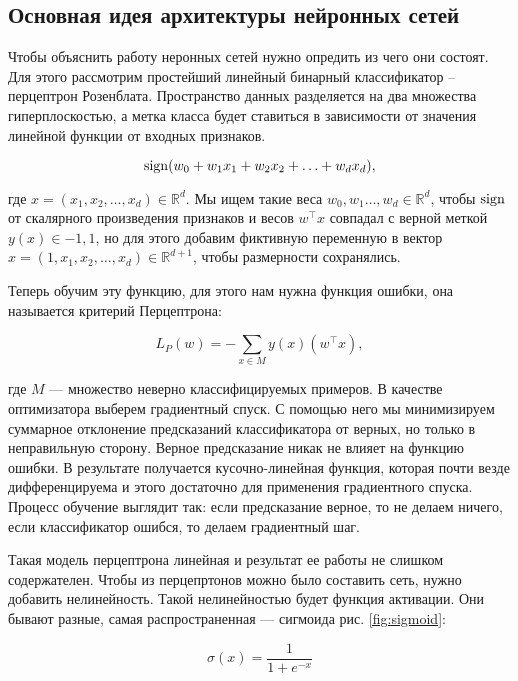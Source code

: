 \subsection{Основная идея архитектуры нейронных сетей}

Чтобы объяснить работу неронных сетей нужно опредить из чего они состоят. Для этого рассмотрим простейший
линейный бинарный классификатор -- перцептрон Розенблата. Пространство данных разделяется на два множества
гиперплоскостью, а метка класса будет ставиться в зависимости от значения линейной функции от входных
признаков.

\begin{equation}
 \operatorname*{sign} (w_0 + w_1x_1 + w_2x_2 + \ldots + w_dx_d),
\end{equation}

где $x =(x_1, x_2, \ldots, x_d) \in \mathds{R}^d$. Мы ищем такие веса $w_0, w_1 \ldots, w_d \in \mathds{R}^d$,
чтобы $\operatorname*{sign}$ от скалярного произведения признаков и весов $w^\top x$ совпадал с верной меткой $y(x) \in
{-1,1}$, но для этого добавим фиктивную переменную в вектор $x =(1, x_1, x_2, \ldots, x_d) \in
\mathds{R}^{d+1}$, чтобы размерности сохранялись.

\bigskip
Теперь обучим эту функцию, для этого нам нужна функция ошибки, она называется критерий Перцептрона:

\begin{equation}
 L_P(w) = - \sum_{x \in M} y(x)(w^\top x),
\end{equation}

где $M$ --- множество неверно классифицируемых примеров. В качестве оптимизатора выберем градиентный спуск. С
помощью него мы минимизируем суммарное отклонение предсказаний классификатора от верных, но только в
неправильную сторону. Верное предсказание никак не влияет на функцию ошибки. В результате получается
кусочно-линейная функция, которая почти везде дифференцируема и этого достаточно для применения градиентного
спуска. Процесс обучение выглядит так: если предсказание верное, то не делаем ничего, если классификатор
ошибся, то делаем градиентный шаг.

Такая модель перцептрона линейная и результат ее работы не слишком содержателен. Чтобы из перцепртонов можно
было составить сеть, нужно добавить нелинейность. Такой нелинейностью будет функция активации. Они бывают
разные, самая распространенная --- сигмоида рис. \ref{fig:sigmoid}:

\begin{equation} \label{eq:sigma}
    \sigma (x) = \frac{1}{1+e^{-x}}
\end{equation}

